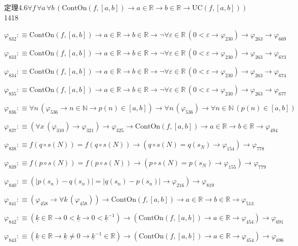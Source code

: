 \begin{fullproof}{定理4.6}{$\forall f\,\forall a\,\forall b\,(\mathrm{ContOn}(f,[a,b]) \to a \in \mathbb{R} \to b \in \mathbb{R} \to \mathrm{UC}(f,[a,b]))$}{1418}
\begin{abbrevlist}
\item $\varphi_{832} :\equiv \mathrm{ContOn}(f,[a,b]) \to a \in \mathbb{R} \to b \in \mathbb{R} \to \neg \forall \varepsilon \in \mathbb{R}\,(0 < \varepsilon \to \varphi_{230}) \to \varphi_{263} \to \varphi_{669}$
\item $\varphi_{833} :\equiv \mathrm{ContOn}(f,[a,b]) \to a \in \mathbb{R} \to b \in \mathbb{R} \to \neg \forall \varepsilon \in \mathbb{R}\,(0 < \varepsilon \to \varphi_{230}) \to \varphi_{263} \to \varphi_{673}$
\item $\varphi_{834} :\equiv \mathrm{ContOn}(f,[a,b]) \to a \in \mathbb{R} \to b \in \mathbb{R} \to \neg \forall \varepsilon \in \mathbb{R}\,(0 < \varepsilon \to \varphi_{230}) \to \varphi_{263} \to \varphi_{674}$
\item $\varphi_{835} :\equiv \mathrm{ContOn}(f,[a,b]) \to a \in \mathbb{R} \to b \in \mathbb{R} \to \neg \forall \varepsilon \in \mathbb{R}\,(0 < \varepsilon \to \varphi_{230}) \to \varphi_{263} \to \varphi_{677}$
\item $\varphi_{836} :\equiv \forall n\,(\varphi_{536} \to n \in \mathbb{N} \to p(n) \in [a,b]) \to \forall n\,(\varphi_{536}) \to \forall n \in \mathbb{N}\,(p(n) \in [a,b])$
\item $\varphi_{837} :\equiv (\forall x\,(\varphi_{310}) \to \varphi_{321}) \to \varphi_{325} \to \mathrm{ContOn}(f,[a,b]) \to a \in \mathbb{R} \to b \in \mathbb{R} \to \varphi_{494}$
\item $\varphi_{838} :\equiv f(q \circ s(N)) = f(q \circ s(N)) \to (q \circ s(N) = q(s_{N}) \to \varphi_{154}) \to \varphi_{778}$
\item $\varphi_{839} :\equiv f(p \circ s(N)) = f(p \circ s(N)) \to (p \circ s(N) = p(s_{N}) \to \varphi_{155}) \to \varphi_{779}$
\item $\varphi_{840} :\equiv (\lvert p(s_{n}) - q(s_{n}) \rvert = \lvert q(s_{n}) - p(s_{n}) \rvert \to \varphi_{216}) \to \varphi_{819}$
\item $\varphi_{841} :\equiv (\varphi_{458} \to \forall k\,(\varphi_{458})) \to \mathrm{ContOn}(f,[a,b]) \to a \in \mathbb{R} \to b \in \mathbb{R} \to \varphi_{513}$
\item $\varphi_{842} :\equiv (\underline{k} \in \mathbb{R} \to 0 < \underline{k} \to 0 < \underline{k}^{-1}) \to (\mathrm{ContOn}(f,[a,b]) \to a \in \mathbb{R} \to \varphi_{454}) \to \varphi_{691}$
\item $\varphi_{843} :\equiv (\underline{k} \in \mathbb{R} \to \underline{k} \neq 0 \to \underline{k}^{-1} \in \mathbb{R}) \to (\mathrm{ContOn}(f,[a,b]) \to a \in \mathbb{R} \to \varphi_{454}) \to \varphi_{696}$

\end{abbrevlist}
\end{fullproof}

